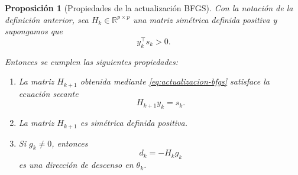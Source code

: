 \documentclass[a4paper,openany,oneside,10pt]{report}
\theoremstyle{pnlTeorema}
\newtheorem{proposicion}{Proposición}[section]
\theoremstyle{pnlDefinicion}
\theoremstyle{pnlObservacion}
\begin{document}
\begin{proposicion}[Propiedades de la actualización BFGS]
\label{prop:actualizacion-bfgs}
Con la notación de la definición anterior, sea $H_k\in\mathbb{R}^{p\times p}$ una matriz simétrica
definida positiva y supongamos que
\[
    y_k^\top s_k>0.
\]

Entonces se cumplen las siguientes propiedades:

\begin{enumerate}
    \item La matriz $H_{k+1}$ obtenida mediante
    \eqref{eq:actualizacion-bfgs} satisface la ecuación secante
    \[
        H_{k+1}y_k=s_k.
    \]

    \item La matriz $H_{k+1}$ es simétrica definida positiva.

    \item Si $g_k\neq 0$, entonces
    \[
        d_k=-H_k g_k
    \]
    es una dirección de descenso en $\theta_k$.
\end{enumerate}
\end{proposicion}
\end{document}
